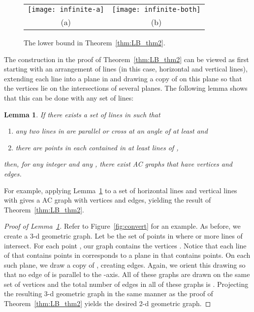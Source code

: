 \documentclass{patmorin}
\newtheorem{lem}{Lemma}
\newcommand{\figlabel}[1]{\label{fig:#1}}
\newcommand{\figref}[1]{\mbox{Figure~\ref{fig:#1}}}
\newcommand{\thmref}[1]{Theorem~\ref{thm:#1}}
\newcommand{\lemlabel}[1]{\label{lem:#1}}
\newcommand{\lemref}[1]{Lemma~\ref{lem:#1}}
\begin{document}
\begin{figure}
  \begin{center}
  \begin{tabular}{cc}
    \texttt{[image: infinite-a]} &
    \texttt{[image: infinite-both]} \\
    (a) & (b)
  \end{tabular}
  \end{center}
  \caption{The lower bound in \thmref{LB_thm2}.}
  \figlabel{infinite}
\end{figure}

\newcommand{\R}{\mathbb{R}}
The construction in the proof of \thmref{LB_thm2} can be viewed as first
starting with an arrangement of lines (in this case,  horizontal
and  vertical lines), extending each line into a plane in  and
drawing a copy of  on this plane so that the vertices lie
on the intersections of several planes.  The following lemma shows that
this can be done with any set of lines:

\begin{lem}\lemlabel{convert}
If there exists a set  of  lines in  such that
\begin{enumerate}
\item any two lines in  are parallel or cross at an angle of at least  and
\item there are  points in  each contained in at least  lines
of , 
\end{enumerate}
then, for any integer  and any , there exist
AC graphs that have  vertices and 
edges.
\end{lem}

For example, applying \lemref{convert} to a set of  horizontal lines
and  vertical lines with  gives a AC graph
with  vertices and  edges, yielding the result
of \thmref{LB_thm2}.

\begin{proof}[Proof of \lemref{convert}]
Refer to \figref{convert} for an example.  As before, we create a 3-d
geometric graph.  Let  be the set of points in  where  or
more lines of  intersect.  For each point , our graph
contains the vertices .  Notice that
each line of  that contains  points in  corresponds to a plane
in  that contains  points.  On each such plane, we draw a
copy of , creating  edges. Again,
we orient this drawing so that no edge of  is parallel
to the -axis.  All  of these graphs are drawn on the same set of
 vertices and the total number of edges in all  of these graphs
is .  Projecting the resulting 3-d geometric graph
in the same manner as the proof of \thmref{LB_thm2} yields the desired
2-d geometric graph.
\end{proof}
\end{document}
